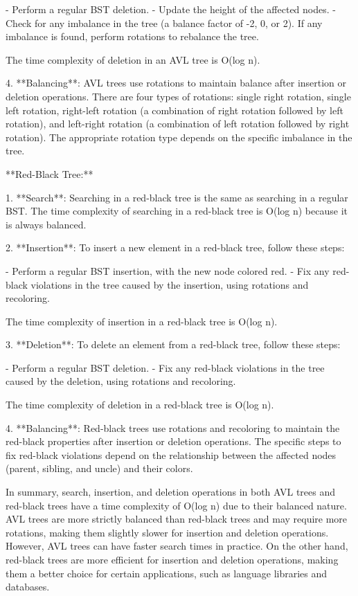 \documentclass{article}
\begin{document}
   - Perform a regular BST deletion.
   - Update the height of the affected nodes.
   - Check for any imbalance in the tree (a balance factor of -2, 0, or 2). If any imbalance is found, perform rotations to rebalance the tree.

   The time complexity of deletion in an AVL tree is O(log n).

4. **Balancing**: AVL trees use rotations to maintain balance after insertion or deletion operations. There are four types of rotations: single right rotation, single left rotation, right-left rotation (a combination of right rotation followed by left rotation), and left-right rotation (a combination of left rotation followed by right rotation). The appropriate rotation type depends on the specific imbalance in the tree.

**Red-Black Tree:**

1. **Search**: Searching in a red-black tree is the same as searching in a regular BST. The time complexity of searching in a red-black tree is O(log n) because it is always balanced.

2. **Insertion**: To insert a new element in a red-black tree, follow these steps:

   - Perform a regular BST insertion, with the new node colored red.
   - Fix any red-black violations in the tree caused by the insertion, using rotations and recoloring.

   The time complexity of insertion in a red-black tree is O(log n).

3. **Deletion**: To delete an element from a red-black tree, follow these steps:

   - Perform a regular BST deletion.
   - Fix any red-black violations in the tree caused by the deletion, using rotations and recoloring.

   The time complexity of deletion in a red-black tree is O(log n).

4. **Balancing**: Red-black trees use rotations and recoloring to maintain the red-black properties after insertion or deletion operations. The specific steps to fix red-black violations depend on the relationship between the affected nodes (parent, sibling, and uncle) and their colors.

In summary, search, insertion, and deletion operations in both AVL trees and red-black trees have a time complexity of O(log n) due to their balanced nature. AVL trees are more strictly balanced than red-black trees and may require more rotations, making them slightly slower for insertion and deletion operations. However, AVL trees can have faster search times in practice. On the other hand, red-black trees are more efficient for insertion and deletion operations, making them a better choice for certain applications, such as language libraries and databases.
\end{document}

